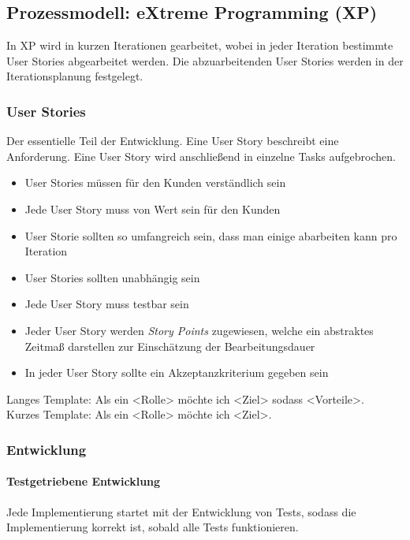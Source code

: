 		\subsection{Prozessmodell: eXtreme Programming (XP)}
			In XP wird in kurzen Iterationen gearbeitet, wobei in jeder Iteration bestimmte User Stories abgearbeitet werden. Die abzuarbeitenden User Stories werden in der Iterationsplanung festgelegt.

			\subsubsection{User Stories}
				Der essentielle Teil der Entwicklung. Eine User Story beschreibt eine Anforderung. Eine User Story wird anschließend in einzelne Tasks aufgebrochen.
				
				\begin{itemize}
					\item User Stories müssen für den Kunden verständlich sein
					\item Jede User Story muss von Wert sein für den Kunden
					\item User Storie sollten so umfangreich sein, dass man einige abarbeiten kann pro Iteration
					\item User Stories sollten unabhängig sein
					\item Jede User Story muss testbar sein
					\item Jeder User Story werden \textit{Story Points} zugewiesen, welche ein abstraktes Zeitmaß darstellen zur Einschätzung der Bearbeitungsdauer
					\item In jeder User Story sollte ein Akzeptanzkriterium gegeben sein
				\end{itemize}
				
				\noindent Langes Template: Als ein <Rolle> möchte ich <Ziel> sodass <Vorteile>. \\
				Kurzes Template: Als ein <Rolle> möchte ich <Ziel>.
			
			\subsubsection{Entwicklung}
				\paragraph{Testgetriebene Entwicklung}
					Jede Implementierung startet mit der Entwicklung von Tests, sodass die Implementierung korrekt ist, sobald alle Tests funktionieren.
				
